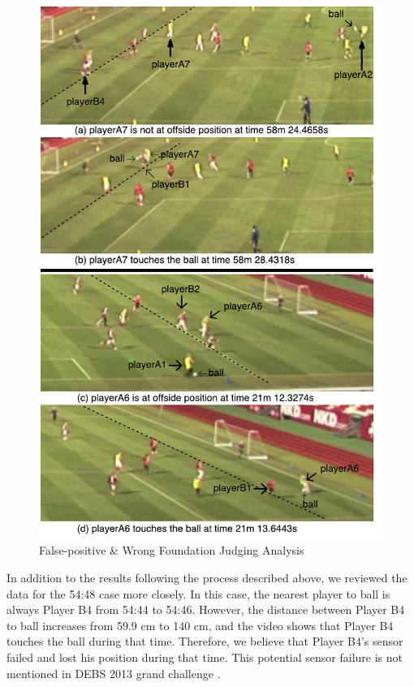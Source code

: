 \begin{figure}[!htbp]
	\centering
	\includegraphics[width=5in]{img/5-fpa}
	\caption{False-positive \& Wrong Foundation Judging Analysis}
	\label{fig:fpa}
\end{figure}

In addition to the results following the process described above, we reviewed the data for the 54:48 case more closely. 
In this case, the nearest player to ball is always Player B4 from 54:44 to 54:46.
However, the distance between Player B4 to ball increases from 59.9 cm to 140 cm, and the video shows that Player B4 touches the ball during that time.
Therefore, we believe that Player B4's sensor failed and lost his position during that time.
This potential sensor failure is not mentioned in DEBS 2013 grand challenge \cite{mutschler2013debs}. 

